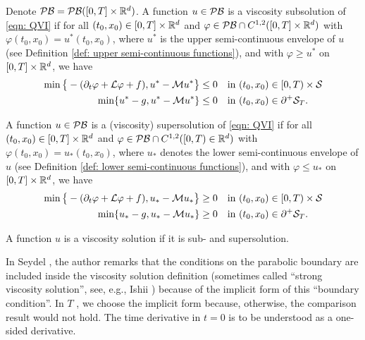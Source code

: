 \begin{definition}
\label{def: Definition 4.1 in Seydel (Viscosity solution)}
    Denote $\mathcal{PB} = \mathcal{PB}([0,T]\times \mathbb{R}^d)$. A function $u \in \mathcal{PB}$ is a viscosity subsolution of \eqref{eqn: QVI} if for all $(t_0,x_0) \in [0,T] \times \mathbb{R}^d$ and $\varphi \in \mathcal{PB} \cap C^{1,2}([0,T]\times \mathbb{R}^d)$ with $\varphi(t_0,x_0) = u^*(t_0,x_0)$, where $u^*$ is the upper semi-continuous envelope of $u$ (see Definition \ref{def: upper semi-continuous functions}), and with $\varphi \geq u^*$ on $[0,T] \times \mathbb{R}^d$, we have
    \begin{align*}
        \min \big\{-(\partial_t \varphi + \mathcal{L} \varphi + f), u^* - \mathcal{M} u^* \big\} \leq 0 & \quad \text{in } (t_0,x_0) \in [0,T) \times \mathcal{S} \\
        \min \{ u^*-g, u^* - \mathcal{M} u^* \} \leq 0 & \quad \text{in } (t_0,x_0) \in \partial^+ \mathcal{S}_T.
    \end{align*}
    
    A function $u \in \mathcal{PB}$ is a (viscosity) supersolution of \eqref{eqn: QVI} if for all $(t_0,x_0) \in [0,T] \times \mathbb{R}^d$ and $\varphi \in \mathcal{PB} \cap C^{1,2}([0,T) \in \mathbb{R}^d)$ with $\varphi(t_0,x_0) = u_*(t_0,x_0)$, where $u_*$ denotes the lower semi-continuous envelope of $u$ (see Definition \ref{def: lower semi-continuous functions}), and with $\varphi \leq u_*$ on $[0,T] \times \mathbb{R}^d$, we have
    \begin{align*}
        \min \big\{-(\partial_t \varphi + \mathcal{L} \varphi + f), u_* - \mathcal{M} u_* \big\} \geq 0 & \quad \text{in } (t_0,x_0) \in [0,T) \times \mathcal{S} \\
        \min \{ u_*-g, u_* - \mathcal{M} u_* \} \geq 0 & \quad \text{in } (t_0,x_0) \in \partial^+ \mathcal{S}_T.
    \end{align*}

    A function $u$ is a viscosity solution if it is sub- and supersolution. 
\end{definition}
\begin{remark}
    In Seydel \cite{seydel2010generalexistenceuniquenessviscosity}, the author remarks that the conditions on the parabolic boundary are included inside the viscosity solution definition (sometimes called ``strong viscosity solution'', see, e.g., Ishii \cite{ishii1993viscosity}) because of the implicit form of this ``boundary condition''. In $T$ , we choose the implicit form because, otherwise, the comparison result would not hold. The time derivative in $t = 0$ is to be understood as a one-sided derivative.
\end{remark}
